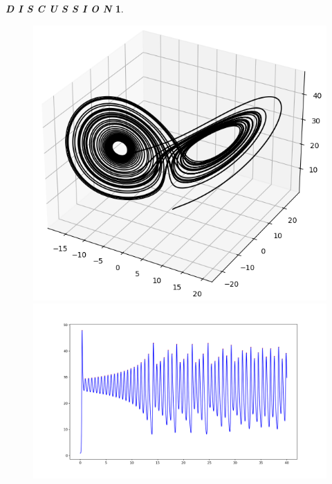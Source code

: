 \documentclass[12pt]{article}
\theoremstyle{plain}
\newtheorem{discussion}{\textit{D I S C U S S I O N}}[section]
\begin{document}
\begin{discussion}
\begin{figure}[H]
\begin{minipage}[c][0.29\width]{0.29\textwidth}
   \centering
   \includegraphics[width=\textwidth]{figure/section2/Lorenz.png}
\end{minipage}
\begin{minipage}[c][0.4\width]{0.4\textwidth}
   \centering
   \includegraphics[width=\textwidth]{figure/section2/Lorenz-z-t.png}
\end{minipage}
\begin{minipage}[c][0.29\width]{0.29\textwidth}
   \centering

\end{minipage}
\end{figure}
\end{discussion}
\end{document}
